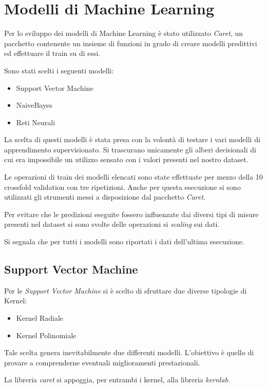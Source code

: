 \chapter{Modelli di Machine Learning}
Per lo sviluppo dei modelli di Machine Learning è stato utilizzato
\textit{Caret}, un pacchetto contenente un insieme di funzioni in grado di 
creare modelli predittivi ed effettuare il train su di essi.

Sono stati scelti i seguenti modelli:
\begin{itemize}
    \item Support Vector Machine
    \item NaiveBayes
    \item Reti Neurali
\end{itemize}
La scelta di questi modelli è stata presa con la volontà di testare 
i vari modelli di apprendimento supervisionato.
Si trascurano unicamente gli alberi decisionali di cui era impossibile 
un utilizzo sensato con i valori presenti nel nostro dataset.

Le operazioni di train dei modelli elencati sono state effettuate 
per mezzo della 10 crossfold validation con tre ripetizioni. 
Anche per questa esecuzione si sono utilizzati 
gli strumenti messi a disposizione dal pacchetto \textit{Caret}.

Per evitare che le predizioni eseguite fossero influenzate dai diversi tipi di misure 
presenti nel dataset si sono svolte delle operazioni si \textit{scaling} sui dati.

\begin{mdframed}[backgroundcolor=yellow!20] 
    Si segnala che per tutti i modelli sono riportati i dati dell'ultima esecuzione.
\end{mdframed}

\section{Support Vector Machine}
Per le \textit{Support Vector Machine} si è scelto di sfruttare due diverse tipologie di Kernel:
\begin{itemize}
    \item Kernel Radiale
    \item Kernel Polinomiale
\end{itemize}
Tale scelta genera inevitabilmente due differenti modelli.
L'obiettivo è quello di provare a comprenderne eventuali miglioramenti prestazionali.

La libreria \textit{caret} si appoggia, per entrambi i kernel, alla libreria 
\textit{kernlab}.

